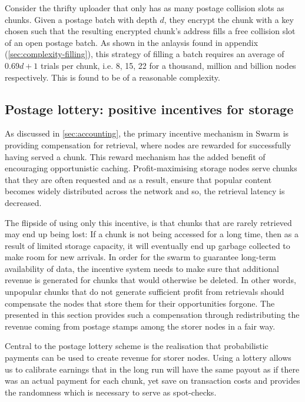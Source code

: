 Consider the thrifty uploader that only has as many postage collision slots as chunks. Given a postage batch with depth $d$, they encrypt the chunk with a key chosen such that the resulting encrypted chunk's address fills a free collision slot of an open postage batch. As shown in the anlaysis found in appendix  (\ref{sec:complexity-filling}), this strategy of filling a batch requires an average of $0.69d+1$ trials per chunk, i.e. 8, 15, 22 for a thousand, million and billion nodes respectively. This is found to be of a reasonable complexity.


\subsection{Postage lottery: positive incentives for storage \statusyellow}\label{sec:postage-lottery}

\yellow{}

As discussed in \ref{sec:accounting}, the primary incentive mechanism in Swarm is providing compensation for retrieval, where nodes are rewarded for successfully having served a chunk. This reward mechanism has the added benefit of encouraging opportunistic caching. Profit-maximising storage nodes serve chunks that they are often requested and as a result, ensure that popular content becomes widely distributed across the network and so, the retrieval latency is decreased.

The flipside of using only this incentive, is that chunks that are rarely retrieved may end up being lost: If a chunk is not being accessed for a long time, then as a result of limited storage capacity, it will eventually end up garbage collected to make room for new arrivals. In order for the swarm to guarantee long-term availability of data, the incentive system needs to make sure that additional revenue is generated for chunks that would otherwise be deleted. In other words, unpopular chunks that do not generate sufficient profit from retrievals should compensate the nodes that store them for their opportunities forgone. The  presented in this section provides such a compensation through redistributing the revenue coming from postage stamps among the storer nodes in a fair way.



Central to the postage lottery scheme is the realisation that probabilistic payments can be used to create revenue for storer nodes.
Using a lottery allows us to calibrate earnings that in the long run will have the same payout as if there was an actual payment for each chunk, yet save on transaction costs and provides the randomness which is necessary to serve as spot-checks.


